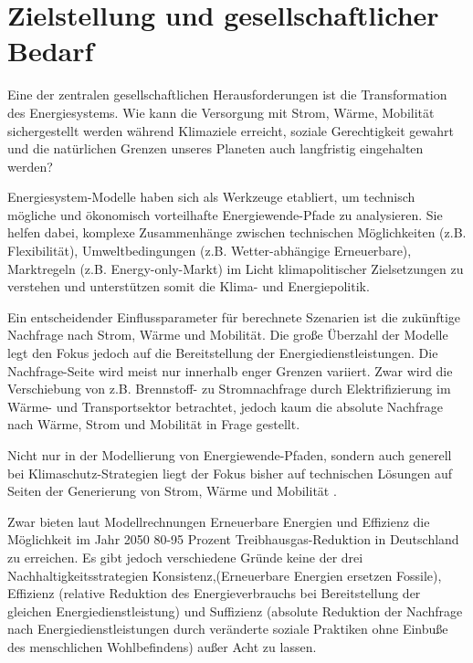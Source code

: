 \documentclass[a4paper,11pt,twoside]{scrartcl}
\begin{document}
\onehalfspacing

\clearpage


{\singlespacing

}

\setcounter{page}{1}

\section{Zielstellung und gesellschaftlicher Bedarf}

Eine der zentralen gesellschaftlichen Herausforderungen ist die Transformation des Energiesystems. Wie kann die Versorgung mit Strom, Wärme, Mobilität sichergestellt werden während Klimaziele erreicht, soziale Gerechtigkeit gewahrt und die natürlichen Grenzen unseres Planeten auch langfristig eingehalten werden? 

Energiesystem-Modelle haben sich als Werkzeuge etabliert, um technisch mögliche und ökonomisch vorteilhafte Energiewende-Pfade zu analysieren. Sie helfen dabei, komplexe Zusammenhänge zwischen technischen Möglichkeiten (z.B. Flexibilität), Umweltbedingungen (z.B. Wetter-abhängige Erneuerbare), Marktregeln (z.B. Energy-only-Markt) im Licht klimapolitischer Zielsetzungen zu verstehen und unterstützen somit die Klima- und Energiepolitik.

Ein entscheidender Einflussparameter für berechnete Szenarien ist die zukünftige Nachfrage nach Strom, Wärme und Mobilität. Die große Überzahl der Modelle legt den Fokus jedoch auf die Bereitstellung der Energiedienstleistungen. Die Nachfrage-Seite wird meist nur innerhalb enger Grenzen variiert. Zwar wird die Verschiebung von z.B. Brennstoff- zu Stromnachfrage durch Elektrifizierung im Wärme- und Transportsektor betrachtet, jedoch kaum die absolute Nachfrage nach Wärme, Strom und Mobilität in Frage gestellt.

Nicht nur in der Modellierung von Energiewende-Pfaden, sondern auch generell bei Klimaschutz-Strategien liegt der Fokus bisher auf technischen Lösungen auf Seiten der Generierung von Strom, Wärme und Mobilität \cite{Creutzig2018}. 

Zwar bieten laut Modellrechnungen Erneuerbare Energien und Effizienz die Möglichkeit im Jahr 2050 80-95 Prozent Treibhausgas-Reduktion in Deutschland \cite{BMWi2017} zu erreichen. Es gibt jedoch verschiedene Gründe keine der drei Nachhaltigkeitsstrategien Konsistenz,(Erneuerbare Energien ersetzen Fossile), Effizienz (relative Reduktion des Energieverbrauchs bei Bereitstellung der gleichen Energiedienstleistung) und Suffizienz (absolute Reduktion der Nachfrage nach Energiedienstleistungen durch veränderte soziale Praktiken ohne Einbuße des menschlichen Wohlbefindens) außer Acht zu lassen.
\end{document}
